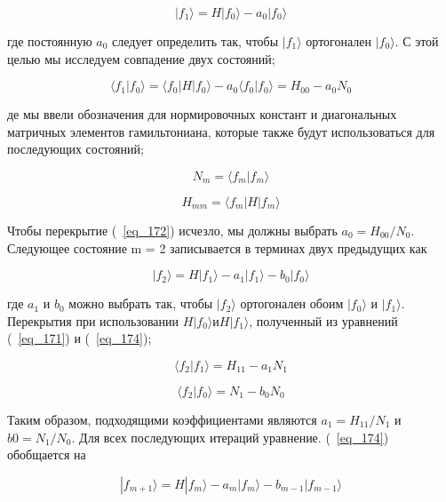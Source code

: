 \documentclass[11pt]{article}
\begin{document}
\begin{equation}
|f_1\rangle = H|f_0\rangle-a_0|f_0\rangle
\label{eq_171}
\end{equation}

где постоянную $a_0$ следует определить так, чтобы $| f_1 \rangle$ ортогонален $| f_0 \rangle$. С этой целью мы исследуем совпадение двух состояний;

\begin{equation}
\langle f_1 | f_0 \rangle = \langle f_0 | H | f_0 \rangle - a_0 \langle f_0 | f_0 \rangle = H_{00} - a_0 N_0
\label{eq_172}
\end{equation}

де мы ввели обозначения для нормировочных констант и диагональных матричных элементов гамильтониана, которые также будут использоваться для последующих состояний;

\begin{equation}
N_m = \langle f_m | f_m \rangle
\label{eq_173}
\end{equation}

\begin{equation*}
H_{mm} = \langle f_m |H| f_m \rangle
\end{equation*}

Чтобы перекрытие (~\ref{eq_172}) исчезло, мы должны выбрать $a_0 = H_{00} / N_0$. Следующее состояние m = 2 записывается в терминах двух предыдущих как

\begin{equation}
|f_2 \rangle = H |f_1 \rangle - a_1|f_1 \rangle - b_0|f_0 \rangle
\label{eq_174}
\end{equation}

где $a_1$ и $b_0$ можно выбрать так, чтобы $| f_2 \rangle$ ортогонален обоим $| f_0 \rangle$ и $| f_1 \rangle$. Перекрытия при использовании $H | f_0 \rangle и H | f_1 \rangle$, полученный из уравнений (~\ref{eq_171}) и (~\ref{eq_174});

\begin{equation}
\langle f_2 | f_1 \rangle = H_{11} - a_1N_1
\label{eq_175}
\end{equation}

\begin{equation*}
\langle f_2 | f_0 \rangle = N_1-b_0N_0
\end{equation*}

Таким образом, подходящими коэффициентами являются $a_1 = H_{11} / N_1$ и $b 0 = N_1 / N_0$. Для всех последующих итераций уравнение. (~\ref{eq_174}) обобщается на

\begin{equation}
| f_{m+1} \rangle = H |f_m \rangle - a_m|f_m \rangle - b_{m-1}|f_{m-1} \rangle
\label{eq_176}
\end{equation}
\end{document}

